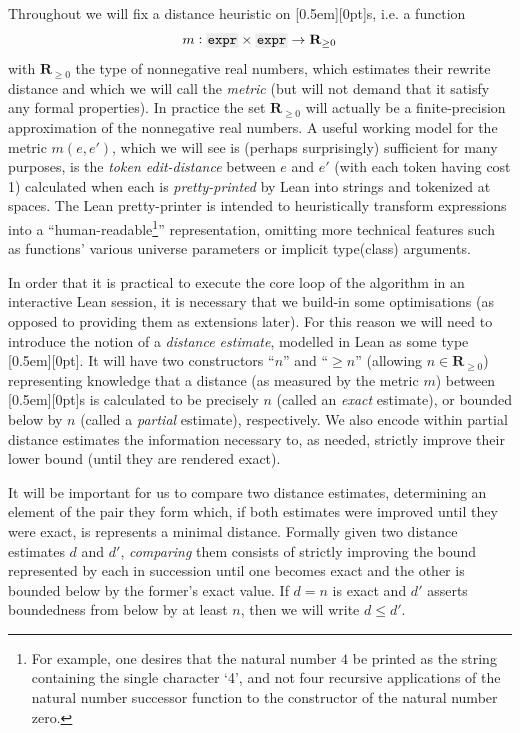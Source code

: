 \documentclass[a4paper]{article}
\newcommand{\RR}{\mathbf{R}}
\theoremstyle{plain}
\theoremstyle{definition}
\newcommand{\xx}[1]{{\colorbox{gray!15}{\raisebox{0em}[0.5em][0pt]{\makebox[\width-0.4em]{\texttt{#1}}}}}}
\newcommand{\expr}{\xx{expr}}
\begin{document}
Throughout we will fix a distance heuristic on \expr{}s, i.e. a function
\begin{equation*}
  m : \xx{expr} \times \xx{expr} \to \RR_{\geq 0}
\end{equation*}
with $\RR_{\geq 0}$ the type of nonnegative real numbers, which estimates their rewrite distance and which we will call the \textit{metric} (but will not demand that it satisfy any formal properties). In practice the set $\RR_{\geq 0}$ will actually be a finite-precision approximation of the nonnegative real numbers. A useful working model for the metric $m(e, e')$, which we will see is (perhaps surprisingly) sufficient for many purposes, is the \textit{token edit-distance} between $e$ and $e'$ (with each token having cost 1) calculated when each is \textit{pretty-printed} by Lean into strings and tokenized at spaces. The Lean pretty-printer is intended to heuristically transform expressions into a ``human-readable\footnote{For example, one desires that the natural number $4$ be printed as the string containing the single character `4', and not four recursive applications of the natural number successor function to the constructor of the natural number zero.}'' representation, omitting more technical features such as functions' various universe parameters or implicit type(class) arguments.

In order that it is practical to execute the core loop of the algorithm in an interactive Lean session, it is necessary that we build-in some optimisations (as opposed to providing them as extensions later). For this reason we will need to introduce the notion of a \textit{distance estimate}, modelled in Lean as some type \xx{dist\_est}. It will have two constructors ``$n$'' and ``$\geq n$'' (allowing $n \in \RR_{\geq 0}$) representing knowledge that a distance (as measured by the metric $m$) between \expr{}s is calculated to be precisely $n$ (called an \textit{exact} estimate), or bounded below by $n$ (called a \textit{partial} estimate), respectively. We also encode within partial distance estimates the information necessary to, as needed, strictly improve their lower bound (until they are rendered exact).

It will be important for us to compare two distance estimates, determining an element of the pair they form which, if both estimates were improved until they were exact, is represents a minimal distance. Formally given two distance estimates $d$ and $d'$, \textit{comparing} them consists of strictly improving the bound represented by each in succession until one becomes exact and the other is bounded below by the former's exact value. If $d = n$ is exact and $d'$ asserts boundedness from below by at least $n$, then we will write $d \leq d'$.
\end{document}
